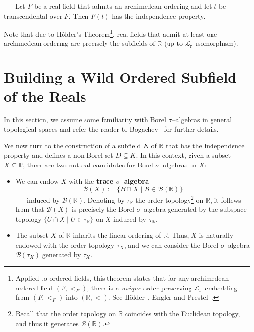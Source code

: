 \begin{corollary}\label{corollary:trans-IP}
    Let $F$ be a real field that admits an archimedean ordering and let $t$ be transcendental over $F$. Then $F(t)$ has the independence property.
\end{corollary}

Note that due to Hölder's Theorem\footnote{Applied to ordered fields, this theorem states that for any archimedean ordered field $(F,<_F)$, there is a \emph{unique} order-preserving $\mathcal{L}_{\mathrm{r}}$--embedding from $(F,<_F)$ into $(\mathbb{R},<)$. See Hölder~\cite[Erster Theil]{Hoelder}, Engler and Prestel~\cite[Proposition~2.1.1]{Engler-Prestel}.}, real fields that admit at least one archimedean ordering are precisely the subfields of $\mathbb{R}$ (up to $\mathcal{L}_{\mathrm{r}}$--i\-so\-mor\-phism).

\section{Building a Wild Ordered Subfield of the Reals}\label{sec::main}

In this section, we assume some familiarity with Borel $\sigma$--algebras in general topological spaces and refer the reader to Bogachev~\cite[\S\,6.2]{Bogachev2} for further details.

We now turn to the construction of a subfield $K$ of $\mathbb{R}$ that has the independence property and defines a non-Borel set $D\subseteq K$. In this context, given a subset $X\subseteq \mathbb{R}$, there are two natural candidates for Borel $\sigma$--algebras on $X$:
\begin{itemize}
    \item We can endow $X$ with the \textbf{trace $\sigma$--algebra}
    $$\mathcal{B}(X):=\{B\cap X\mid B\in\mathcal{B}(\mathbb{R})\}$$
    induced by $\mathcal{B}(\mathbb{R})$. Denoting by $\tau_\mathbb{R}$ the order topology\footnote{Recall that the order topology on $\mathbb{R}$ coincides with the Euclidean topology, and thus it generates $\mathcal{B}(\mathbb{R})$.} on $\mathbb{R}$, it follows from \cite[Lemma~6.2.4]{Bogachev2} that $\mathcal{B}(X)$ is precisely the Borel $\sigma$--algebra generated by the subspace topology $\{U\cap X\mid U\in\tau_\mathbb{R}\}$ on $X$ induced by~$\tau_\mathbb{R}$.
   
    \item The subset $X$ of $\mathbb{R}$ inherits the linear ordering of $\mathbb{R}$. Thus, $X$ is naturally endowed with the order topology $\tau_X$, and we can consider the Borel $\sigma$--algebra $\mathcal{B}(\tau_X)$ generated by $\tau_X$.
\end{itemize}

